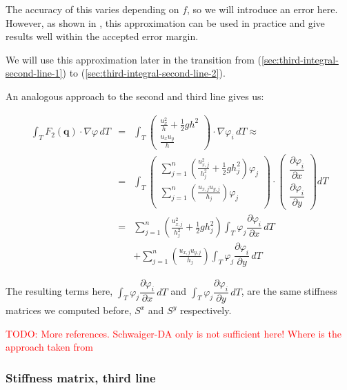 \documentclass{article}
\newcommand{\todo}[1]{\textcolor{red}{TODO: #1}}
\newcommand{\pd}[2]{\dfrac{\partial #1}{\partial #2}}
\renewcommand{\phi}{\varphi}
\begin{document}
The accuracy of this varies depending on $f$, so we will introduce an error here. However, as shown in \cite{cockburn1999discontinuous}, this approximation can be used in practice and give results well within the accepted error margin.

We will use this approximation later in the transition from (\ref{sec:third-integral-second-line-1}) to (\ref{sec:third-integral-second-line-2}).

An analogous approach to the second and third line gives us:

\begin{eqnarray}
  \label{eq:third-integral-second-line-1}
  \int_T F_2(\mathbf{q}) \cdot \nabla \phi \, dT & = &
  \int_T
  \begin{pmatrix}
    \frac{u_x^2}{h} + \frac{1}{2} g h^2 \\ \frac{u_x u_y}{h}
  \end{pmatrix}
  \cdot \nabla \phi_i \, dT \approx \\
  \label{eq:third-integral-second-line-2}
  & = &
  \int_T
  \begin{pmatrix}
    \sum_{j=1}^n \left(\frac{u_{x,j}^2}{h_j^2} + \frac{1}{2} g h_j^2\right) \phi_j \\
    \sum_{j=1}^n \left(\frac{u_{x,j} u_{y,j}}{h_j}\right) \phi_j \\
  \end{pmatrix}
  \cdot
  \begin{pmatrix}
    \pd{\phi_i}{x} \\
    \pd{\phi_i}{y}
  \end{pmatrix} dT \\
  & = & \nonumber \sum_{j=1}^n \left(\frac{u_{x,j}^2}{h_j^2} + \frac{1}{2} g h_j^2\right) \int_T \phi_j \pd{\phi_i}{x} \, dT \\
  & {} & + \nonumber \sum_{j=1}^n \left(\frac{u_{x,j} u_{y,j}}{h_j}\right) \int_T \phi_j \pd{\phi_i}{y} \, dT
\end{eqnarray}

The resulting terms here, $\int_T \phi_j \pd{\phi_i}{x} \, dT$ and $\int_T \phi_j \pd{\phi_i}{y} \, dT$, are the same stiffness matrices we computed before, $S^x$ and $S^y$ respectively.

\todo{More references. Schwaiger-DA only is not sufficient here! Where is the approach taken from}

\subsubsection{Stiffness matrix, third line}
\end{document}
